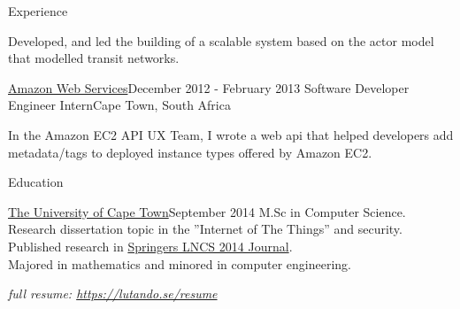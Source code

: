 \documentclass{resume} %
\begin{document}
\begin{rSection}{Experience}
\begin{rSubsection}
            \item Developed, and led the building of a scalable system based on the actor model that modelled transit
            networks.
                
        \end{rSubsection}

        \begin{rSubsection}
            {\href{https://aws.amazon.com/}{Amazon Web Services}}{December 2012 - February 2013}
            {Software Developer Engineer Intern}{Cape Town, South Africa}
            
            \item In the Amazon EC2 API UX Team, I wrote a web api that helped 
                developers add metadata/tags to deployed instance types offered by Amazon EC2.
                
        \end{rSubsection}

    \end{rSection}

    
    \begin{rSection}{Education}


        \begin{rSubsection}
            {\href{http://www.uct.ac.za/}{The University of Cape Town}}{September 2014}{}{}
            M.Sc in Computer Science. \\
            Research dissertation topic in the ”Internet of The Things” and security. \\
            Published research in \href{https://link.springer.com/chapter/10.1007/978-3-319-13174-0_12}{Springers LNCS 2014 Journal}. \\
            Majored in mathematics and minored in computer engineering. \\
                \begin{center}
                    \textit{full resume: \url{https://lutando.se/resume}}
                \end{center}
        \end{rSubsection}

    \end{rSection}
\end{document}
